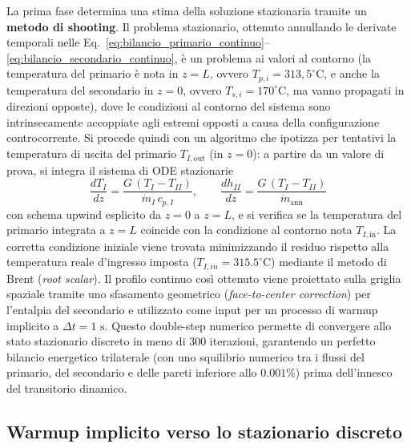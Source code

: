\documentclass[12pt]{report}
\begin{document}
La prima fase determina una stima della soluzione stazionaria tramite un \textbf{metodo di shooting}. Il problema stazionario, ottenuto annullando le derivate temporali nelle Eq.~\eqref{eq:bilancio_primario_continuo}--\eqref{eq:bilancio_secondario_continuo}, è un problema ai valori al contorno (la temperatura del primario è nota in $z=L$, ovvero $T_{p,i} = 313,5^\circ\text{C}$, e anche la temperatura del secondario in $z=0$, ovvero $T_{s,i} = 170^\circ\text{C}$, ma vanno propagati in direzioni opposte), dove le condizioni al contorno del sistema sono intrinsecamente accoppiate agli estremi opposti a causa della configurazione controcorrente. Si procede quindi con un algoritmo  che ipotizza per tentativi la temperatura di uscita del primario $T_{I,\text{out}}$ (in $z=0$): a partire da un valore di prova, si integra il sistema di ODE stazionarie
\begin{equation}
    \frac{dT_I}{dz} = \frac{G\,(T_I-T_{II})}{\dot m_I\, c_{p,I}}, \qquad
    \frac{dh_{II}}{dz} = \frac{G\,(T_I-T_{II})}{\dot m_{\text{ann}}}
    \label{eq:ode_stazionarie}
\end{equation}
con schema upwind esplicito da $z=0$ a $z=L$, e si verifica se la temperatura del primario integrata a $z=L$ coincide con la condizione al contorno nota $T_{I,\text{in}}$. La corretta condizione iniziale viene trovata minimizzando il residuo rispetto alla temperatura reale d'ingresso imposta ($T_{I,in} = 315.5^\circ\text{C}$) mediante il metodo di Brent (\textit{root scalar}).
Il profilo continuo così ottenuto viene proiettato sulla griglia spaziale tramite uno sfasamento geometrico (\textit{face-to-center correction}) per l'entalpia del secondario e utilizzato come input per un processo di warmup implicito a $\Delta t = 1\text{ s}$. Questo double-step numerico permette di convergere allo stato stazionario discreto in meno di 300 iterazioni, garantendo un perfetto bilancio energetico trilaterale (con uno squilibrio numerico tra i flussi del primario, del secondario e delle pareti inferiore allo $0.001\%$) prima dell'innesco del transitorio dinamico.


\subsection{Warmup implicito verso lo stazionario discreto}
\end{document}
